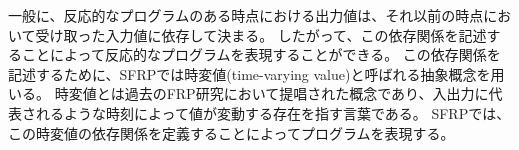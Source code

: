 一般に、反応的なプログラムのある時点における出力値は、それ以前の時点において受け取った入力値に依存して決まる。
したがって、この依存関係を記述することによって反応的なプログラムを表現することができる。
この依存関係を記述するために、SFRPでは時変値(time-varying value)と呼ばれる抽象概念を用いる。
時変値とは過去のFRP研究において提唱された概念であり、入出力に代表されるような時刻によって値が変動する存在を指す言葉である。
SFRPでは、この時変値の依存関係を定義することによってプログラムを表現する。
